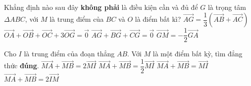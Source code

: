 \begin{ex}%
	Khẳng định nào sau đây \textbf{không phải} là điều kiện cần và đủ để $G$ là trọng tâm $\Delta ABC$, với $M$ là trung điểm của $BC$ và $O$ là điểm bất kì?
	\choice
	{$\overrightarrow{AG}=\dfrac{1}{3} \left( \overrightarrow{AB}+\overrightarrow{AC} \right)$}
	{\True $ \overrightarrow{OA}+\overrightarrow{OB}+\overrightarrow{OC}+3\overrightarrow{OG}=\overrightarrow{0}$}
	{$\overrightarrow{AG}+\overrightarrow{BG}+\overrightarrow{CG}=\overrightarrow{0}$}
	{$\overrightarrow{GM}=-\dfrac{1}{2} \overrightarrow{GA}$}
\end{ex}
\begin{ex}%
	Cho $I$ là trung điểm của đoạn thẳng $AB$. Với $M$ là một điểm bất kỳ, tìm đẳng thức \textbf{đúng}.
	\choice
	{\True $\overrightarrow{MA}+\overrightarrow{MB}=2\overrightarrow{MI}$}
	{$\overrightarrow{MA}+\overrightarrow{MB}=\dfrac{1}{2}\overrightarrow{MI}$}
	{$\overrightarrow{MA}+\overrightarrow{MB}=\overrightarrow{MI}$}
	{$\overrightarrow{MA}+\overrightarrow{MB}=2\overrightarrow{IM}$}
	\end{ex}
